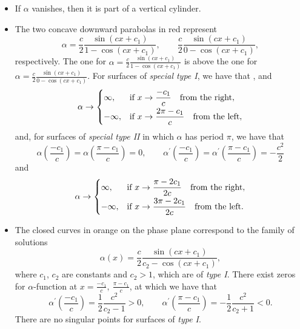 \documentclass[pdftex]{sigma}
\numberwithin{equation}{section}
\begin{document}
\begin{itemize}\itemsep=0pt
\item If $\alpha$ vanishes, then it is part of a vertical cylinder.

\item The two concave downward parabolas in red represent
\[
\alpha=\frac{c}{2}\frac{\sin{(cx+c_1)}}{1-\cos{(cx+c_1)}},\qquad \frac{c}{2}\frac{\sin{(cx+c_1)}}{0-\cos{(cx+c_1)}},
\]
respectively. The one for $\alpha=\frac{c}{2}\frac{\sin{(cx+c_1)}}{1-\cos{(cx+c_1)}}$ is above the one for $\alpha=\frac{c}{2}\frac{\sin{(cx+c_1)}}{0-\cos{(cx+c_1)}}$. For
surfaces of \emph{special type I}, we have that
, 
and
\begin{equation*}
\alpha \rightarrow \begin{cases}
\infty, & \text{if}\ x\rightarrow\dfrac{-c_{1}}{c}\quad \text{from the right}, \vspace{1mm}\\
-\infty, & \text{if}\ x\rightarrow \dfrac{2\pi-c_1}{c} \quad \text{from the
left},
\end{cases}
\end{equation*}
and, for surfaces of \emph{special type II} in which $\alpha$ has period $\pi$, we have that
\[
\alpha\left(\frac{-c_{1}}{c}\right)=\alpha\left(\frac{\pi-c_1}{c}\right)=0,\qquad \alpha^{\prime
}\left(\frac{-c_{1}}{c}\right)=\alpha^{\prime }\left(\frac{\pi-c_1}{c}\right)=-\frac{c^2}{2}
\]
and
\begin{equation*}
\alpha \rightarrow \begin{cases}
\infty, & \text{if}\ x\rightarrow \dfrac{\pi-2c_1}{2c}\quad \text{from the
right}, \vspace{1mm}\\
-\infty, & \text{if}\ x\rightarrow \dfrac{3\pi-2c_1}{2c}\quad \text{from the
left}.
\end{cases}
\end{equation*}

\item The closed curves in orange on the phase plane correspond to the family of solutions
\[
\alpha(x)=\frac{c}{2}\frac{\sin{(cx+c_{1})}}{c_{2}-\cos{(cx+c_{1})}},
\]
where $c_1$, $c_2$ are constants and $c_2>1$, which are of \emph{type I}.
There exist zeros for $\alpha$-function at $x=\frac{-c_{1}}{c},\ \frac{\pi-c_1}{c}$,
at which we have that
\[
\alpha^{\prime }\left(\frac{-c_1}{c}\right)=\frac{1}{2}\frac{c^2}{c_{2}-1}>0,\qquad \alpha^{\prime
}\left(\frac{\pi-c_1}{c}\right)=-\frac{1}{2}\frac{c^2}{c_{2}+1}<0.
\]
There are no singular points for surfaces of \emph{type I}.


\end{itemize}
\end{document}
